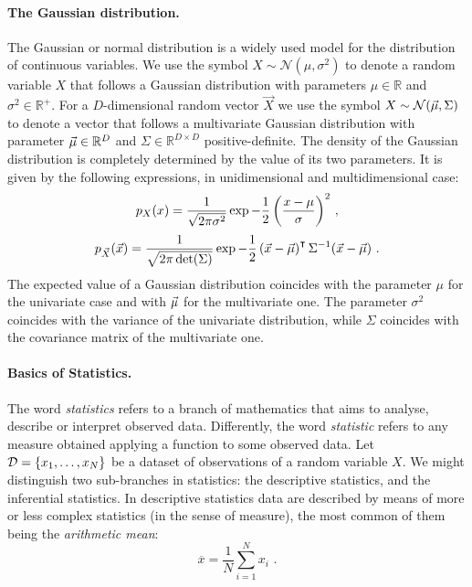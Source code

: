 \paragraph*{The Gaussian distribution.}
The Gaussian or normal distribution is a widely used model for the distribution of continuous variables. We use the symbol $X\sim\mathcal{N}(\mu,\sigma^2)$ to denote a random variable $X$ that follows a Gaussian distribution with parameters $\mu\in\mathbb{R}$ and $\sigma^2\in\mathbb{R}^{+}$. For a $D$-dimensional random vector $\vec{X}$ we use the symbol $X\sim\mathcal{N}(\vec{\mu},\Sigma)$ to denote a vector that follows a multivariate Gaussian distribution with parameter $\vec{\mu}\in\mathbb{R}^D$ and $\Sigma\in\mathbb{R}^{D\times D}$ positive-definite. The density of the Gaussian distribution is completely determined by the value of its two parameters. It is given by the following expressions, in unidimensional and multidimensional case: 
\begin{equation}
p_X(x) = \frac{1}{\sqrt{2\pi\sigma^2}}\exp{-\frac{1}{2}\left(\frac{x-\mu}{\sigma}\right)^2}\mbox{ ,}
\end{equation}
\begin{equation}
p_{\vec{X}}(\vec{x}) = \frac{1}{\sqrt{2\pi\det(\Sigma)}}\exp{-\frac{1}{2}\left(\vec{x}-\vec{\mu}\right)^\intercal \Sigma^ {-1}(\vec{x}-\vec{\mu})} \mbox{ .}
\end{equation}
The expected value of a Gaussian distribution coincides with the parameter $\mu$ for the univariate case and with $\vec{\mu}$ for the multivariate one. The parameter $\sigma^2$ coincides with the variance of the univariate distribution, while $\Sigma$ coincides with the covariance matrix of the multivariate one.

\paragraph*{Basics of Statistics.}
The word \emph{statistics}  refers to a branch of mathematics that aims to analyse, describe or interpret observed data. Differently, the word \emph{statistic} refers to any measure obtained applying a function to some observed data. Let $\mathcal{D} = \{x_1,\dots,x_N\}$ be a dataset of observations of a random variable $X$. We might distinguish two sub-branches in statistics: the descriptive statistics, and the inferential statistics. In descriptive statistics data are described by means of more or less complex statistics (in the sense of measure), the most common of them being the \emph{arithmetic mean}: 
\begin{equation}
\overline{x} = \frac{1}{N}\sum_{i=1}^N x_i \mbox{ .}
\end{equation}

